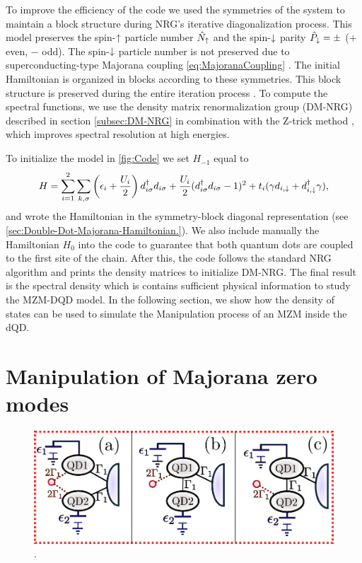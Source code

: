 

To  improve the efficiency of the code we used the symmetries of the system to maintain a block structure during NRG's iterative diagonalization process. This model preserves the spin-$\uparrow$ particle number $\hat{N}_\uparrow$ and the spin-$\downarrow$ parity $\hat{P}_\downarrow = \pm $ ($+$ even, $-$ odd). The spin-$\downarrow$ particle number is not preserved due to superconducting-type Majorana coupling  \eqref{eq:MajoranaCoupling} . The initial Hamiltonian is organized in blocks according to these symmetries. This block structure is preserved during the entire iteration process \cite{bulla_numerical_2008}. To compute the spectral functions, we use the density matrix renormalization group (DM-NRG) described in section \ref{subsec:DM-NRG} in combination with the Z-trick method \cite{oliveira_generalized_1994}, which improves spectral resolution at high energies.


To initialize the model in \ref{fig:Code} we set $H_{-1}$ equal to 
\begin{equation}
H =\sum_{i=1}^2\sum_{k,\sigma}\left(\epsilon_{i}+\frac{U_i}{2}\right)d_{i\sigma}^{\dagger}d_{i\sigma}+ \frac{U_i}{2}(d_{i \sigma}^{\dagger}d_{i \sigma}-1)^{2} + t_i(\gamma d_{i,\downarrow}+d^\dagger_{i,\downarrow}\gamma),
\end{equation} 
\noindent and wrote the Hamiltonian in the symmetry-block diagonal representation (see \ref{sec:Double-Dot-Majorana-Hamiltonian.}). We also include manually the Hamiltonian $H_0$ into the code to guarantee that both quantum dots are coupled to the first site of the chain. After this, the code follows the standard NRG algorithm and prints the density matrices to initialize DM-NRG. The final result is the spectral density which is contains sufficient physical information to study the MZM-DQD model. In the following section, we show how the density of states can be used to simulate the Manipulation process of an MZM inside the dQD. 




\section{Manipulation of Majorana zero modes}


\begin{figure}[bt]
\centering
\includegraphics[scale=0.7]{IMAGES/DQD-M/3Model.png}
\caption{\label{fig:MajoranaModels}. \protect{}} 
\end{figure}


